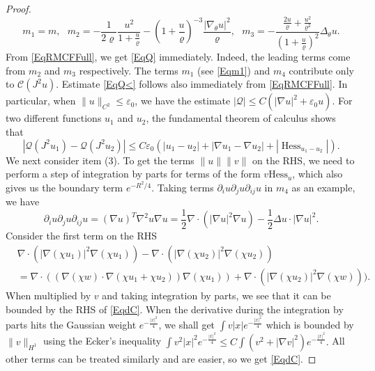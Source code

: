\documentclass[11pt]{amsart}
\numberwithin{equation}{section}
\numberwithin{equation}{section}
\newcommand{\eps}{\varepsilon}
\newcommand{\cC}{\mathcal{C}}
\newcommand{\cQ}{\mathcal{Q}}
\DeclareMathOperator{\Hess}{Hess}
\begin{document}
\begin{proof}
		\begin{equation*}
			m_1=m,
			\ \ \ m_2=-\frac{1}{2\varrho}\frac{u^2}{1+\frac{u}{\varrho}}-(1+\frac{u}{\varrho})^{-3}\frac{|\nabla_\theta u|^2}{\varrho},
			\ \ \ 
			m_3=-\frac{\frac{2u}{\varrho}+\frac{u^2}{\varrho^2}}{(1+\frac{u}{\varrho})^2}\Delta_\theta u.
		\end{equation*}
		From \eqref{EqRMCFFull}, we get \eqref{EqQ} immediately. Indeed, the leading terms come from $m_2$ and $m_3$ respectively. The terms $m_1$ (see \eqref{Eqm1}) and $m_4$ contribute only to $\cC(J^2u)$. Estimate \eqref{EqQ<} follows also immediately from \eqref{EqRMCFFull}. In particular, when $\|u\|_{C^{2}}\leq \eps_0$, we have the estimate
		$		|\cQ|\leq C(|\nabla u|^2+\eps_0u).
		$	
		For two different functions $u_1$ and $u_2$, the fundamental theorem of calculus shows that
		\begin{equation*}
			|\cQ(J^2u_1)-\cQ(J^2u_2)|\leq C\eps_0(|u_1-u_2|+|\nabla u_1-\nabla u_2|+|\Hess_{u_1-u_2}|).
		\end{equation*}
		We next consider item (3). To get the terms $\|u\|\|v\|$ on the RHS, we need to perform a step of integration by parts for terms of the form $v\mathrm{Hess}_u$, which also gives us the boundary term $e^{-R^2/4}$. Taking terms $\partial_iu\partial_j u\partial_{ij}u$ in $m_4$ as an example, we have $$\partial_iu\partial_j u\partial_{ij}u=(\nabla u)^T\nabla^2u\nabla u=\frac{1}{2}\nabla\cdot (|\nabla u|^2\nabla u)-\frac{1}{2}\Delta u \cdot |\nabla u|^2. $$ 
		Consider the first term on the RHS
		\begin{equation*}
			\begin{aligned}
				&\nabla\cdot (|\nabla (\chi u_1)|^2\nabla (\chi u_1))-\nabla\cdot (|\nabla (\chi u_2)|^2\nabla (\chi u_2))\\
				&=\nabla\cdot ((\nabla (\chi w)\cdot\nabla(\chi u_1+\chi u_2)) \nabla (\chi u_1))+\nabla\cdot (|\nabla (\chi u_2)|^2\nabla (\chi w))). 		
			\end{aligned}
		\end{equation*}
		When multiplied by $v$ and taking integration by parts, we see that it can be bounded by the RHS of \eqref{EqdC}. 
		When the derivative during the integration by parts hits the Gaussian weight $e^{-\frac{|x|^2}{4}}$, we shall get $\int v|x|e^{-\frac{|x|^2}{4}}$ which is bounded by $\|v\|_{H^1}$ using the Ecker's inequality $\int v^2|x|^2e^{-\frac{|x|^2}{4}}\leq C\int (v^2+|\nabla v|^2) e^{-\frac{|x|^2}{4}}. $ 
		All other terms can be treated similarly and are easier, so we get \eqref{EqdC}. 
	\end{proof}
	
	
\end{document}
